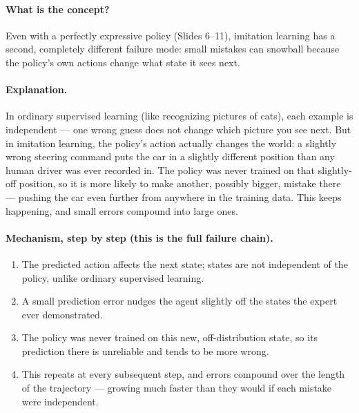 \documentclass[11pt]{article}
\begin{document}
\paragraph{What is the concept?}
Even with a perfectly expressive policy (Slides 6--11), imitation learning has a second,
completely different failure mode: small mistakes can snowball because the policy's own
actions change what state it sees next.

\paragraph{Explanation.}
In ordinary supervised learning (like recognizing pictures of cats), each example is
independent --- one wrong guess does not change which picture you see next. But in
imitation learning, the policy's action actually changes the world: a slightly wrong
steering command puts the car in a slightly different position than any human driver was
ever recorded in. The policy was never trained on that slightly-off position, so it is
more likely to make another, possibly bigger, mistake there --- pushing the car even
further from anywhere in the training data. This keeps happening, and small errors
compound into large ones.

\paragraph{Mechanism, step by step (this is the full failure chain).}
\begin{enumerate}
\item The predicted action affects the next state; states are not independent of the
policy, unlike ordinary supervised learning.
\item A small prediction error nudges the agent slightly off the states the expert ever
demonstrated.
\item The policy was never trained on this new, off-distribution state, so its
prediction there is unreliable and tends to be more wrong.
\item This repeats at every subsequent step, and errors compound over the length of the
trajectory --- growing much faster than they would if each mistake were independent.
\end{enumerate}
\end{document}
